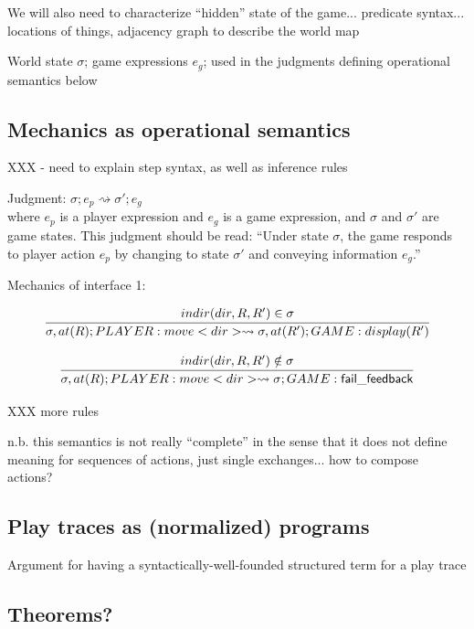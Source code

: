   We will also need to characterize ``hidden'' state of the game...
  predicate syntax... locations of things, adjacency graph to describe the
  world map

  World state $\sigma$; game expressions $e_g$; used in the judgments
  defining operational semantics below


  \subsection{Mechanics as operational semantics}

  XXX - need to explain step syntax, as well as inference rules

  
  
  \newcommand{\stepsto}{\rightsquigarrow}

  Judgment: $\sigma; e_p \stepsto \sigma'; e_g$ \\
  where $e_p$ is a player expression and $e_g$ is a game expression, and
  $\sigma$ and $\sigma'$ are game states. This judgment should be read:
  ``Under state $\sigma$, the game responds to player action $e_p$ by
  changing to state $\sigma'$ and conveying information $e_g$.''

  Mechanics of interface 1:

  \[
    \infer{
      \sigma, at(R); PLAYER: move<dir> \stepsto \sigma, at(R'); GAME:
      display(R')
    }
    {
      indir(dir, R, R') \in \sigma
    }
  \]


  \[
    \infer{
      \sigma, at(R); PLAYER: move<dir> \stepsto 
      \sigma; GAME: \mathsf{fail\_feedback}
    }
    {
      indir(dir, R, R') \notin \sigma
    }
  \]

  XXX more rules

  n.b. this semantics is not really ``complete'' in the sense that it does
  not define meaning for sequences of actions, just single exchanges... how
  to compose actions?

  \subsection{Play traces as (normalized) programs}
  
  Argument for having a syntactically-well-founded structured term for a
  play trace

  \subsection{Theorems?}

